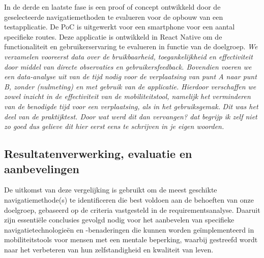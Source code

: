 In de derde en laatste fase is een proof of concept ontwikkeld door de geselecteerde navigatiemethoden te evalueren voor de opbouw van een testapplicatie. De PoC is uitgewerkt voor een smartphone voor een aantal specifieke routes. Deze applicatie is ontwikkeld in React Native om de functionaliteit en gebruikerservaring te evalueren in functie van de doelgroep. \textit{We verzamelen vooreerst data over de bruikbaarheid, toegankelijkheid en effectiviteit door middel van directe observaties en gebruikersfeedback. Bovendien voeren we een data-analyse uit van de tijd nodig voor de verplaatsing van punt A naar punt B, zonder (nulmeting) en met gebruik van de applicatie. Hierdoor verschaffen we zowel inzicht in de effectiviteit van de mobiliteitstool, namelijk het verminderen van de benodigde tijd voor een verplaatsing, als in het gebruiksgemak.} \textit{Dit was het deel van de praktijktest. Door wat werd dit dan vervangen? dat begrijp ik zelf niet zo goed dus gelieve dit hier eerst eens te schrijven in je eigen woorden.}

\subsection*{Resultatenverwerking, evaluatie en aanbevelingen}

De uitkomst van deze vergelijking is gebruikt om de meest geschikte navigatiemethode(s) te identificeren die best voldoen aan de behoeften van onze doelgroep, gebaseerd op de criteria vastgesteld in de requirementsanalyse. Daaruit zijn essentiële conclusies gevolgd nodig voor het aanbevelen van specifieke navigatietechnologieën en -benaderingen die kunnen worden geïmplementeerd in mobiliteitstools voor mensen met een mentale beperking, waarbij gestreefd wordt naar het verbeteren van hun zelfstandigheid en kwaliteit van leven.

